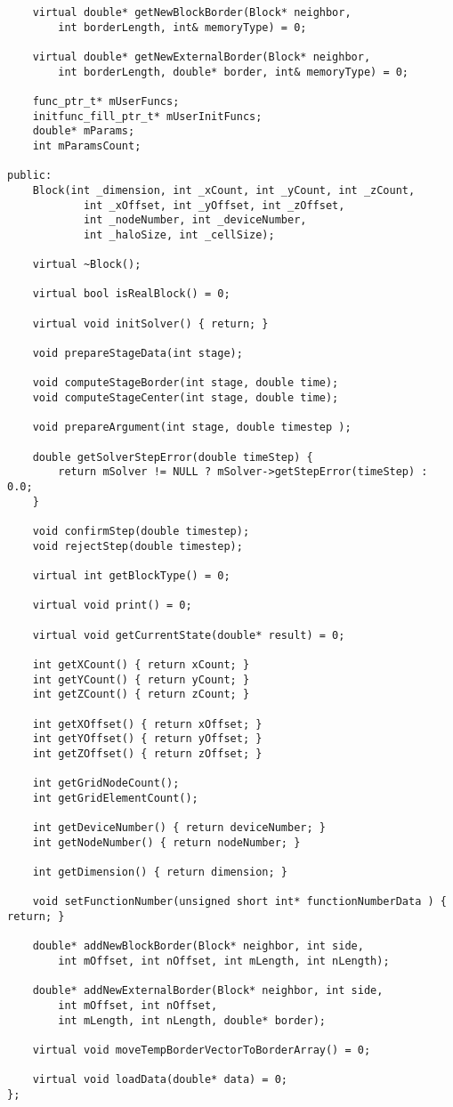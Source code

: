 \documentclass[a4paper, 14pt]{extarticle}
\theoremstyle{definition}
\begin{document}
\begin{lstlisting}
	virtual double* getNewBlockBorder(Block* neighbor,
		int borderLength, int& memoryType) = 0;
		
	virtual double* getNewExternalBorder(Block* neighbor,
		int borderLength, double* border, int& memoryType) = 0;

	func_ptr_t* mUserFuncs;
	initfunc_fill_ptr_t* mUserInitFuncs;
	double* mParams;
	int mParamsCount;

public:
	Block(int _dimension, int _xCount, int _yCount, int _zCount,
			int _xOffset, int _yOffset, int _zOffset,
			int _nodeNumber, int _deviceNumber,
			int _haloSize, int _cellSize);

	virtual ~Block();

	virtual bool isRealBlock() = 0;

	virtual void initSolver() { return; }

	void prepareStageData(int stage);

	void computeStageBorder(int stage, double time);
	void computeStageCenter(int stage, double time);

	void prepareArgument(int stage, double timestep );

	double getSolverStepError(double timeStep) {
		return mSolver != NULL ? mSolver->getStepError(timeStep) : 0.0;
	}

	void confirmStep(double timestep);
	void rejectStep(double timestep);

	virtual int getBlockType() = 0;

	virtual void print() = 0;

	virtual void getCurrentState(double* result) = 0;

	int getXCount() { return xCount; }
	int getYCount() { return yCount; }
	int getZCount() { return zCount; }

	int getXOffset() { return xOffset; }
	int getYOffset() { return yOffset; }
	int getZOffset() { return zOffset; }

	int getGridNodeCount();
	int getGridElementCount();

	int getDeviceNumber() { return deviceNumber; }
	int getNodeNumber() { return nodeNumber; }

	int getDimension() { return dimension; }

	void setFunctionNumber(unsigned short int* functionNumberData ) { return; }

	double* addNewBlockBorder(Block* neighbor, int side,
		int mOffset, int nOffset, int mLength, int nLength);
		
	double* addNewExternalBorder(Block* neighbor, int side,
		int mOffset, int nOffset,
		int mLength, int nLength, double* border);

	virtual void moveTempBorderVectorToBorderArray() = 0;

	virtual void loadData(double* data) = 0;
};
\end{lstlisting}
\end{document}
